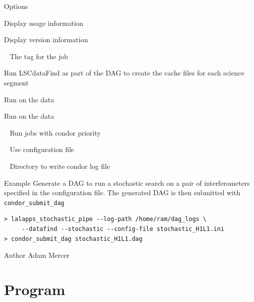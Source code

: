 \begin{entry}
\item[Options]\leavevmode
\begin{entry}
\item[\option{--help}] Display usage information
\item[\option{--version}] Display version information
\item[\option{--user-tag}~\parm{TAG}] The tag for the job
\item[\option{--datafind}] Run LSCdataFind as part of the DAG to create
the cache files for each science segment
\item[\option{--stochastic}] Run  on the data
\item[\option{--stopp}] Run  on the data
\item[\option{--priority}~\parm{PRIO}] Run jobs with condor priority 
\item[\option{--config-file}~\parm{FILE}] Use configuration file 
\item[\option{--log-path}~\parm{PATH}] Directory to write condor log file
\end{entry}

\item[Example]
Generate a DAG to run a stochastic search on a pair of interferometers
specified in the configuration file. The generated DAG is then submitted
with \texttt{condor\_submit\_dag}

\begin{verbatim}
> lalapps_stochastic_pipe --log-path /home/ram/dag_logs \
     --datafind --stochastic --config-file stochastic_H1L1.ini
> condor_submit_dag stochastic_H1L1.dag
\end{verbatim}

\item[Author]
Adam Mercer
\end{entry}

\clearpage
\section{Program }
\label{program:lalapps-stochastic-bayes}

